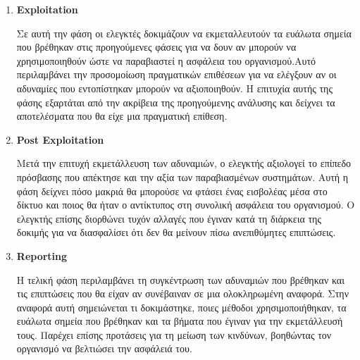 \begin{enumerate}
\item \textbf{\lt  Exploitation}

Σε αυτή την φάση οι ελεγκτές δοκιμάζουν να εκμεταλλευτούν τα ευάλωτα σημεία που βρέθηκαν στις προηγούμενες φάσεις για να δουν αν μπορούν να χρησιμοποιηθούν ώστε να παραβιαστεί η ασφάλεια του οργανισμού.Αυτό περιλαμβάνει την προσομοίωση πραγματικών επιθέσεων για να ελέγξουν αν οι αδυναμίες που εντοπίστηκαν μπορούν να αξιοποιηθούν. Η επιτυχία αυτής της φάσης εξαρτάται από την ακρίβεια της προηγούμενης ανάλυσης και δείχνει τα αποτελέσματα που θα είχε  μια πραγματική επίθεση.

\item \textbf{\lt Post Exploitation}


Μετά την επιτυχή εκμετάλλευση των αδυναμιών, ο ελεγκτής αξιολογεί το επίπεδο πρόσβασης που απέκτησε και την αξία των παραβιασμένων συστημάτων. Αυτή η φάση δείχνει πόσο μακριά θα μπορούσε να φτάσει ένας εισβολέας μέσα στο δίκτυο και ποιος θα ήταν ο αντίκτυπος στη συνολική ασφάλεια του οργανισμού. Ο ελεγκτής επίσης διορθώνει τυχόν αλλαγές που έγιναν κατά τη διάρκεια της δοκιμής για να διασφαλίσει ότι δεν θα μείνουν πίσω ανεπιθύμητες επιπτώσεις.

\item \textbf{\lt Reporting}

Η τελική φάση περιλαμβάνει τη συγκέντρωση των αδυναμιών που βρέθηκαν και τις επιπτώσεις που θα είχαν αν συνέβαιναν σε μια ολοκληρωμένη αναφορά. Στην αναφορά αυτή σημειώνεται τι δοκιμάστηκε, ποιες μέθοδοι χρησιμοποιήθηκαν, τα ευάλωτα σημεία που βρέθηκαν και τα βήματα που έγιναν για την εκμετάλλευσή τους. Παρέχει επίσης προτάσεις για τη μείωση των κινδύνων, βοηθώντας τον οργανισμό να βελτιώσει την ασφάλειά του. 

\end{enumerate}


